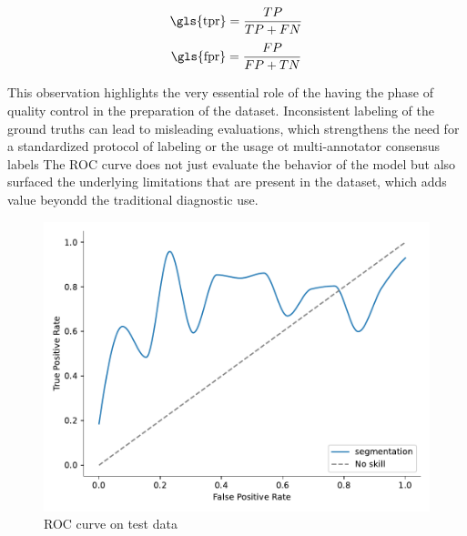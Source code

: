 \begin{equation}
\addcontentsline{equ}{equations}{\protect\numberline{\theequation}\gls{tpr}}
\text{\gls{tpr}} = \frac{TP}{TP + FN}
\end{equation}
\begin{equation}
\addcontentsline{equ}{equations}{\protect\numberline{\theequation}\gls{fpr}}
\text{\gls{fpr}} = \frac{FP}{FP + TN}
\end{equation}

This observation highlights the very essential role of the having the phase of quality control in the preparation of the dataset. Inconsistent labeling of the ground truths can lead to misleading evaluations, which strengthens the need for a standardized protocol of labeling or the usage ot multi-annotator consensus labels The ROC curve does not just evaluate the behavior of the model but also surfaced the underlying limitations that are present in the dataset, which adds value beyondd the traditional diagnostic use.

\begin{figure}[htb!] %
\centering
\centering
\includegraphics[width=1\textwidth]{images/ROC.pdf}
\caption{\centering ROC curve on test data}
\label{Fig:roc}
\end{figure}

